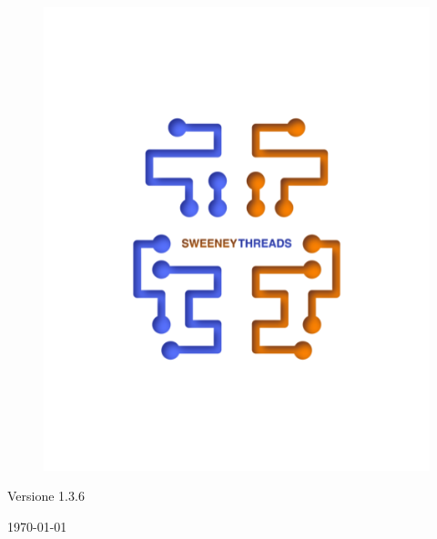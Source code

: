 \documentclass[a4paper]{article}
\begin{document}
\begin{titlepage}
		\begin{figure}[H]
			\centering
			\includegraphics[scale=0.8]{sweeney.png}
		\end{figure}
		\begin{center}
			Versione 1.3.6
		\end{center}
		{\large \today}\\[3cm] 
		\vfill  
	\end{titlepage}
	
	
	\tableofcontents
	
	\newpage 
\end{document}
